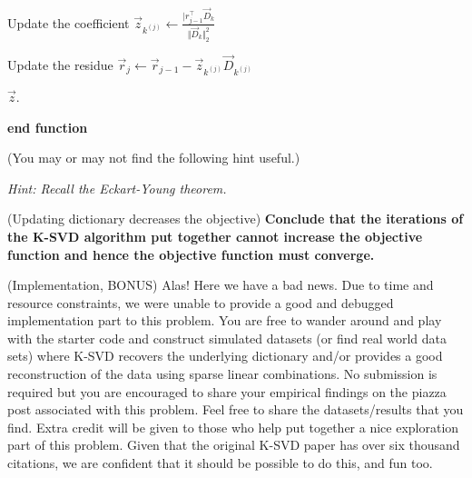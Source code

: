 \documentclass[preview]{standalone}
\begin{document}
\begin{Parts}
\begin{algorithm}
{{				Update the coefficient $\vec z_{k^{(j)}} \leftarrow \frac{\vert  r_{j-1}^\top  \vec D_k }{\Vert  \vec D_k\Vert_2^2}$
				
				Update the residue $\vec r_{j} \leftarrow \vec r_{j-1} - \vec z_{k^{(j)}}  \vec D_{k^{(j)}}$
			}
			\KwRet $\vec z$.
		}
		\vspace{1mm}
		\textbf{end function}
		\vspace{2mm}
			\end{algorithm}
	
																				
	
	
	
	 (You may or may not find the following hint useful.)
	
	{\em Hint: Recall the Eckart-Young theorem.}
	
								
	
	
		
	\Part (Updating dictionary decreases the objective) {\bf Conclude that
		the iterations of the K-SVD algorithm put together cannot increase
		the objective function and hence the objective function must
		converge.}
	
	
	

	\Part (Implementation, BONUS) Alas! Here we have a bad news. Due to time and resource
	constraints, we were unable to provide a good and debugged implementation part to this problem.
	You are free to wander around and play with the starter code
        and construct simulated datasets (or find real world data sets)
	where K-SVD recovers the underlying dictionary and/or
        provides a good reconstruction of the data using sparse linear
        combinations. 
	No submission is required but you are encouraged to share your
        empirical findings on the piazza
	post associated with this problem. Feel free to share the
        datasets/results that you find. Extra credit will be given to
        those who help put together a nice exploration part of this
        problem. Given that the original K-SVD paper has over six
        thousand citations, we are confident that it should be
        possible to do this, and fun too. 


\end{Parts}
\end{document}
